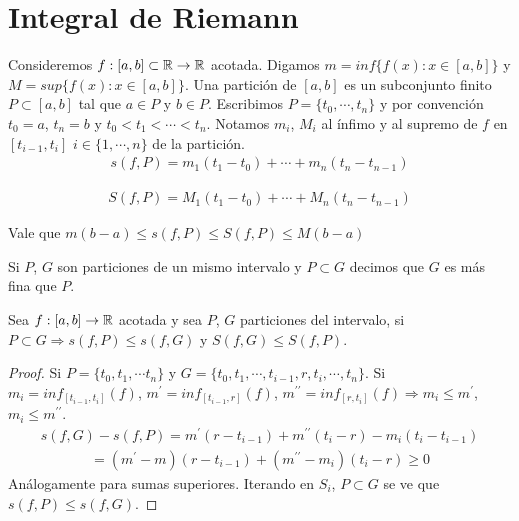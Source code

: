 \section{Integral de Riemann}

Consideremos $f: [a, b] \subset \mathbb{R} \to \mathbb{R}$ acotada. Digamos $m = inf\{ f(x) : x \in [a,b] \}$ y $M = sup \{ f(x) : x \in [a, b] \}$.
Una partición de $[a, b]$ es un subconjunto finito $P \subset [a, b]$ tal que $a \in P$ y $b \in P$.
Escribimos $P = \{ t_0, \cdots, t_n \}$ y por convención $t_0 = a$, $t_n = b$ y $t_0 < t_1 < \cdots < t_n$.
Notamos $m_i$, $M_i$ al ínfimo y al supremo de $f$ en $[t_{i-1}, t_i]$ $i \in \{ 1, \cdots, n \}$ de la partición.
\begin{align*}
  s(f, P) = m_1 (t_1 - t_0) + \cdots + m_n (t_n - t_{n-1})
\end{align*}

\begin{align*}
  S(f, P) = M_1 (t_1 - t_0) + \cdots + M_n (t_n - t_{n-1})
\end{align*}

Vale que $m (b-a) \leq s(f, P) \leq S(f, P) \leq M (b-a)$

\begin{definition}
  Si $P$, $G$ son particiones de un mismo intervalo y $P \subset G$ decimos que $G$ es más fina que $P$.
\end{definition}

\begin{lemma}
  Sea $f: [a, b] \to \mathbb{R}$ acotada y sea $P$, $G$ particiones del intervalo, si $P \subset G \Rightarrow s(f, P) \leq s(f, G)$ y $S(f, G) \leq S(f, P)$.
  \begin{proof}
    Si $P = \{ t_0, t_1, \cdots t_n \}$ y $G = \{ t_0, t_1, \cdots, t_{i-1}, r, t_i, \cdots, t_n \}$. Si $m_i = inf_{[t_{i-1}, t_i]}(f)$, $m^{\prime} = inf_{[t_{i-1}, r]}(f)$, $m^{\prime \prime} = inf_{[r, t_i]}(f) \Rightarrow m_i \leq m^{\prime}$, $m_i \leq m^{\prime \prime}$. \begin{align*}
      s(f, G) - s(f, P) = m^{\prime} (r - t_{i-1}) + m^{\prime \prime} (t_i - r) - m_i (t_i - t_{i-1})
    \end{align*}
    \begin{align*}
      = (m^{\prime} - m)(r - t_{i-1}) + (m^{\prime \prime} - m_i) (t_i - r) \geq 0
    \end{align*}
    Análogamente para sumas superiores. Iterando en $S_i$, $P \subset G$ se ve que $s(f, P) \leq s(f, G)$.
  \end{proof}
\end{lemma}

